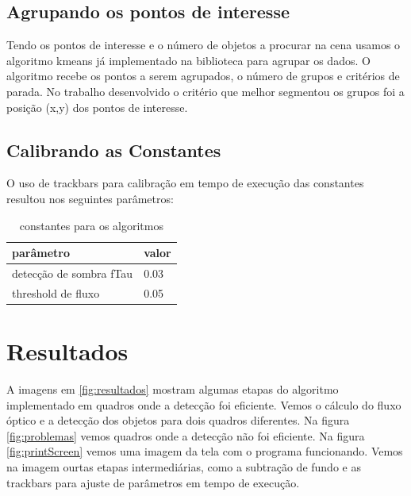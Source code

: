 \documentclass[journal]{IEEEtran}
\begin{document}
\subsection{Agrupando os pontos de interesse}
Tendo os pontos de interesse e o número de objetos a 
procurar na cena usamos o algoritmo kmeans já implementado na 
biblioteca para agrupar os dados. O algoritmo recebe os pontos a 
serem agrupados, o número de grupos e critérios de parada. No 
trabalho desenvolvido o critério que melhor segmentou os grupos foi a 
posição (x,y) dos pontos de interesse.


\subsection{Calibrando as Constantes}
O uso de trackbars para calibração em tempo de execução 
das constantes resultou nos seguintes parâmetros:
\begin{table}[!htp]
\centering
 \begin{tabular}{|l|l|}\hline
 parâmetro & valor \\ \hline
 detecção de sombra fTau & 0.03 \\ \hline
 threshold de fluxo & 0.05 \\ \hline 
 \end{tabular}
\caption{constantes para os algoritmos}
\label{tab:threshold}
\end{table}


\newpage

\section{Resultados}
A imagens em \ref{fig:resultados} mostram algumas etapas do algoritmo
implementado em quadros onde a detecção foi eficiente.
Vemos o cálculo do fluxo óptico e a detecção dos objetos para
dois quadros diferentes. Na figura \ref{fig:problemas} vemos quadros onde
a detecção não foi eficiente. Na figura \ref{fig:printScreen} vemos uma imagem
da tela com o programa funcionando. Vemos na imagem ourtas etapas intermediárias,
como a subtração de fundo e as trackbars para ajuste de parâmetros em tempo 
de execução.
\end{document}
